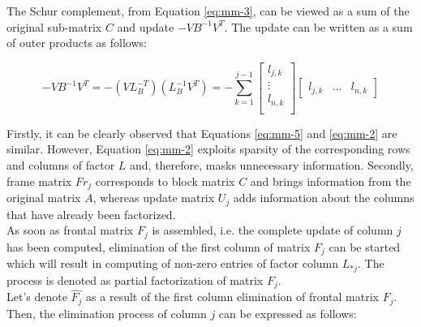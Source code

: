 The Schur complement, from Equation \ref{eq:mm-3}, can be viewed as a sum of the original sub-matrix $C$ and update $-VB^{-1}V^{T}$. The update can be written as a sum of outer products as follows:

\begin{equation} \label{eq:mm-5}
	-VB^{-1}V^{T} = -(VL^{-T}_{B})(L^{-1}_{B}V^{T}) = - \sum_{k=1}^{j-1}  \begin{bmatrix}
l_{j,k} \\
\vdots \\
l_{n,k} \\
\end{bmatrix} \begin{bmatrix}
l_{j,k} & \dots & l_{n,k}
\end{bmatrix} 
\end{equation}

Firstly, it can be clearly observed that Equations \ref{eq:mm-5} and \ref{eq:mm-2} are similar. However, Equation \ref{eq:mm-2} exploits sparsity of the corresponding rows and columns of factor $L$ and, therefore, masks unnecessary information. Secondly, frame matrix $Fr_{j}$ corresponds to block matrix $C$ and brings information from the original matrix $A$, whereas update matrix $\hat{U_{j}}$ adds information about the columns that have already been factorized.\\




As soon as frontal matrix $F_{j}$ is assembled, i.e. the complete update of column $j$ has been computed, elimination of the first column of matrix $F_{j}$ can be started which will result in computing of non-zero entries of factor column $L_{*j}$. The process is denoted as  partial factorization of matrix $F_{j}$.\\

Let's denote $\hat{F_{j}}$ as a result of the first column elimination of frontal matrix $F_{j}$. Then, the elimination process of column $j$ can be expressed as follows:\\


